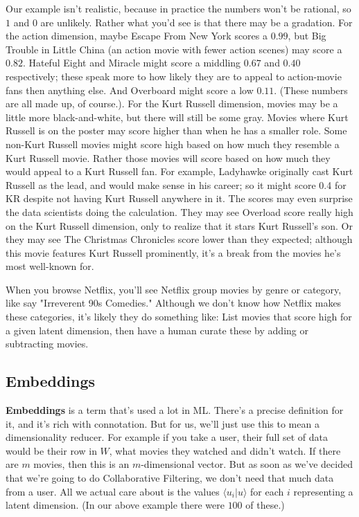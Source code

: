 \documentclass{amsbook}
\begin{document}
Our example isn't realistic, because in practice the numbers won't be rational, so $1$ and $0$ are unlikely.  Rather what you'd see is that there may be a gradation.  For the action dimension, maybe Escape From New York scores a $0.99$, but Big Trouble in Little China (an action movie with fewer action scenes) may score a $0.82$.  Hateful Eight and Miracle might score a middling $0.67$ and $0.40$ respectively; these speak more to how likely they are to appeal to action-movie fans then anything else.  And Overboard might score a low $0.11$.  (These numbers are all made up, of course.). For the Kurt Russell dimension, movies may be a little more black-and-white, but there will still be some gray.  Movies where Kurt Russell is on the poster may score higher than when he has a smaller role.  Some non-Kurt Russell movies might score high based on how much they resemble a Kurt Russell movie.  Rather those movies will score based on how much they would appeal to a Kurt Russell fan.  For example, Ladyhawke originally cast Kurt Russell as the lead, and would make sense in his career; so it might score 0.4 for KR despite not having Kurt Russell anywhere in it.  The scores may even surprise the data scientists doing the calculation.  They may see Overload score really high on the Kurt Russell dimension, only to realize that it stars Kurt Russell's son.  Or they may see The Christmas Chronicles score lower than they expected; although this movie features Kurt Russell prominently, it's a break from the movies he's most well-known for.

When you browse Netflix, you'll see Netflix group movies by genre or category, like say "Irreverent 90s Comedies."  Although we don't know how Netflix makes these categories, it's likely they do something like:  List movies that score high for a given latent dimension, then have a human curate these by adding or subtracting movies.

\subsection{Embeddings}

{\bf Embeddings} is a term that's used a lot in ML.  There's a precise definition for it, and it's rich with connotation.  But for us, we'll just use this to mean a dimensionality reducer.  For example if you take a user, their full set of data would be their row in $W$, what movies they watched and didn't watch.  If there are $m$ movies, then this is an $m$-dimensional vector.  But as soon as we've decided that we're going to do Collaborative Filtering, we don't need that much data from a user.  All we actual care about is the values $\langle u_i|u\rangle$ for each $i$ representing a latent dimension.  (In our above example there were $100$ of these.)
\end{document}
